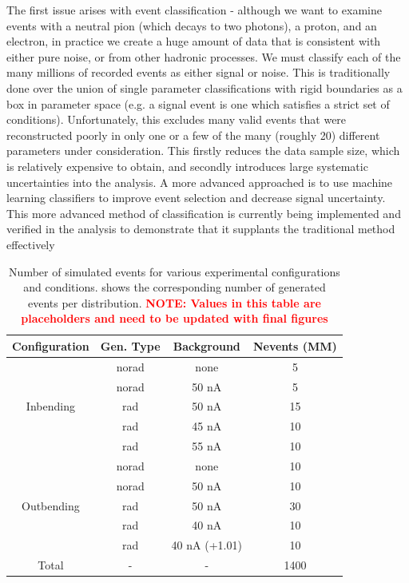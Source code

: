     The first issue arises with event classification - although we want to examine events with a neutral pion (which decays
to two photons), a proton, and an electron, in practice we create a huge amount of data that is consistent with either pure
noise, or from other hadronic processes. We must classify each of the many millions of recorded events as either signal or
noise. This is traditionally done over the union of single parameter classifications with rigid boundaries as a box in parameter
space (e.g. a signal event is one which satisfies a strict set of conditions). Unfortunately, this excludes many valid events that
were reconstructed poorly in only one or a few of the many (roughly 20) different parameters under consideration. This firstly
reduces the data sample size, which is relatively expensive to obtain, and secondly introduces large systematic uncertainties
into the analysis. A more advanced approached is to use machine learning classifiers to improve event selection and decrease
signal uncertainty. This more advanced method of classification is currently being implemented and verified in the analysis to
demonstrate that it supplants the traditional method effectively


    \begin{table}[h]
        \centering
        \begin{tabular}{c|ccc}
            \textbf{Configuration} & \textbf{Gen. Type} & \textbf{Background} & \textbf{Nevents (MM)} \\ \hline
                & norad & none & 5 \\
                & norad & 50 nA & 5 \\
            Inbending & rad & 50 nA & 15 \\
                & rad & 45 nA & 10 \\
                & rad & 55 nA & 10 \\ \hline
                & norad & none & 10 \\
                & norad &  50 nA & 10 \\
            Outbending & rad & 50 nA & 30 \\
                 & rad & 40 nA & 10 \\
             & rad & 40 nA (+1.01) & 10 \\
            \hline
            Total & - & - & 1400 \\
        \end{tabular}
    \caption[Distribution of Simulated Events by Configuration]{Number of simulated events for various experimental configurations and conditions. shows the corresponding number of generated events per distribution. \textcolor{red}{\textbf{NOTE: Values in this table are placeholders and need to be updated with final figures}}}
    \label{table:simulated_data}
    \end{table}
\fi